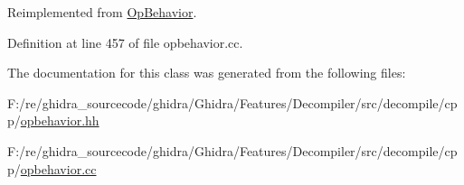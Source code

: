 Reimplemented from \mbox{\hyperlink{class_op_behavior_aeeed3af7aa35264b31a1f182884214a9}{Op\+Behavior}}.



Definition at line 457 of file opbehavior.\+cc.



The documentation for this class was generated from the following files\+:\begin{DoxyCompactItemize}
\item 
F\+:/re/ghidra\+\_\+sourcecode/ghidra/\+Ghidra/\+Features/\+Decompiler/src/decompile/cpp/\mbox{\hyperlink{opbehavior_8hh}{opbehavior.\+hh}}\item 
F\+:/re/ghidra\+\_\+sourcecode/ghidra/\+Ghidra/\+Features/\+Decompiler/src/decompile/cpp/\mbox{\hyperlink{opbehavior_8cc}{opbehavior.\+cc}}\end{DoxyCompactItemize}
